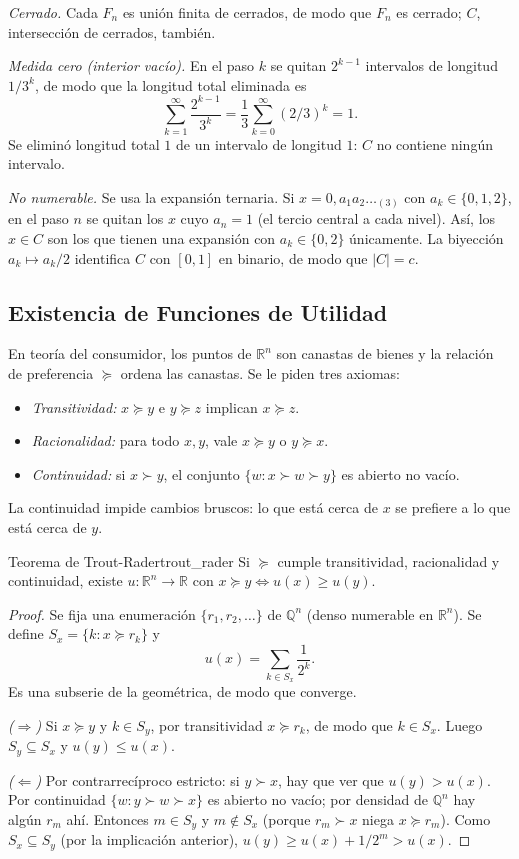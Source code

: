 \documentclass[11pt, a4paper]{article}
\begin{document}
\textit{Cerrado.} Cada $F_n$ es unión finita de cerrados, de modo que $F_n$ es cerrado; $C$,
intersección de cerrados, también.

\textit{Medida cero (interior vacío).} En el paso $k$ se quitan $2^{k-1}$ intervalos de longitud
$1/3^k$, de modo que la longitud total eliminada es
$$ \sum_{k=1}^\infty \frac{2^{k-1}}{3^k} = \frac{1}{3} \sum_{k=0}^\infty (2/3)^k = 1. $$
Se eliminó longitud total $1$ de un intervalo de longitud $1$: $C$ no contiene ningún intervalo.

\textit{No numerable.} Se usa la expansión ternaria. Si $x = 0,a_1a_2\dots_{(3)}$ con
$a_k \in \{0,1,2\}$, en el paso $n$ se quitan los $x$ cuyo $a_n = 1$ (el tercio central a cada
nivel). Así, los $x \in C$ son los que tienen una expansión con $a_k \in \{0, 2\}$ únicamente.
La biyección $a_k \mapsto a_k/2$ identifica $C$ con $[0,1]$ en binario, de modo que $|C| = c$.

\subsection{Existencia de Funciones de Utilidad}

En teoría del consumidor, los puntos de $\mathbb{R}^n$ son canastas de bienes y la relación de
preferencia $\succeq$ ordena las canastas. Se le piden tres axiomas:
\begin{itemize}
    \item \textit{Transitividad:} $x \succeq y$ e $y \succeq z$ implican $x \succeq z$.
    \item \textit{Racionalidad:} para todo $x, y$, vale $x \succeq y$ o $y \succeq x$.
    \item \textit{Continuidad:} si $x \succ y$, el conjunto $\{w : x \succ w \succ y\}$ es abierto
    no vacío.
\end{itemize}
La continuidad impide cambios bruscos: lo que está cerca de $x$ se prefiere a lo que está cerca
de $y$.

\begin{teorema}{Teorema de Trout-Rader}{trout_rader}
Si $\succeq$ cumple transitividad, racionalidad y continuidad, existe
$u: \mathbb{R}^n \to \mathbb{R}$ con $x \succeq y \iff u(x) \ge u(y)$.
\end{teorema}

\begin{proof}
Se fija una enumeración $\{r_1, r_2, \dots\}$ de $\mathbb{Q}^n$ (denso numerable en
$\mathbb{R}^n$). Se define $S_x = \{k : x \succeq r_k\}$ y
$$ u(x) = \sum_{k \in S_x} \frac{1}{2^k}. $$
Es una subserie de la geométrica, de modo que converge.

\textit{($\Rightarrow$)} Si $x \succeq y$ y $k \in S_y$, por transitividad $x \succeq r_k$, de modo
que $k \in S_x$. Luego $S_y \subseteq S_x$ y $u(y) \le u(x)$.

\textit{($\Leftarrow$)} Por contrarrecíproco estricto: si $y \succ x$, hay que ver que
$u(y) > u(x)$. Por continuidad $\{w : y \succ w \succ x\}$ es abierto no vacío; por densidad de
$\mathbb{Q}^n$ hay algún $r_m$ ahí. Entonces $m \in S_y$ y $m \notin S_x$ (porque $r_m \succ x$
niega $x \succeq r_m$). Como $S_x \subseteq S_y$ (por la implicación anterior),
$u(y) \ge u(x) + 1/2^m > u(x)$.
\end{proof}
\end{document}
